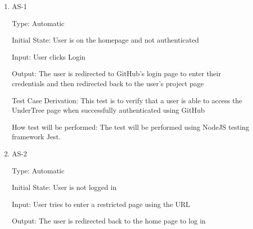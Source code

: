 \documentclass[12pt, titlepage]{article}
\begin{document}
	\begin{enumerate}
		
		
		\item{AS-1\\}
		
		Type: Automatic
		
		Initial State: User is on the homepage and not authenticated
		
		Input: User clicks Login
		
		Output: The user is redirected to GitHub's login page to enter their credentials and then redirected back to the user's project page
		
		Test Case Derivation: This test is to verify that a user is able to access the UnderTree page when successfully authenticated using GitHub
		
		How test will be performed: The test will be performed using NodeJS testing framework Jest.
		
		\item{AS-2\\}
		
		Type: Automatic
		
		Initial State: User is not logged in
		
		Input: User tries to enter a restricted page using the URL
		
		Output: The user is redirected back to the home page to log in
		

\end{enumerate}
\end{document}
